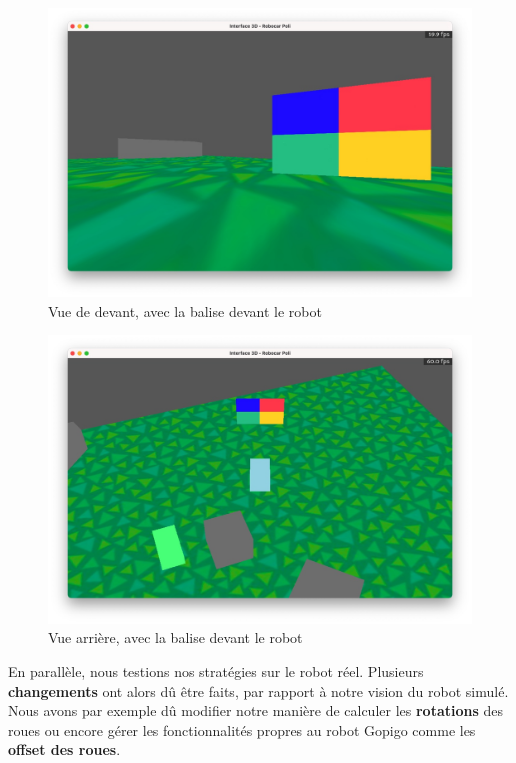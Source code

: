 \documentclass[12pt]{article}
\begin{document}
\begin{center}
\begin{figure}[p]
  \centering 
  \includegraphics[width=1\linewidth]{image2.jpg} 
  \caption{Vue de devant, avec la balise devant le robot} 
  \label{fig:exemple}
\end{figure}

\begin{figure}[h]
    \centering
    \includegraphics[width=1\linewidth]{image3.jpg}
    \caption{Vue arrière, avec la balise devant le robot}
    \label{fig:enter-label}
\end{figure}
\end{center} 

\FloatBarrier

\hspace{\parindent}En parallèle, nous testions nos stratégies sur le robot réel. Plusieurs \textbf{changements} ont alors dû être faits, par rapport à notre vision du robot simulé. Nous avons par exemple dû modifier notre manière de calculer les \textbf{rotations} des roues ou encore gérer les fonctionnalités propres au robot Gopigo comme les \textbf{offset des roues}. 
\end{document}
